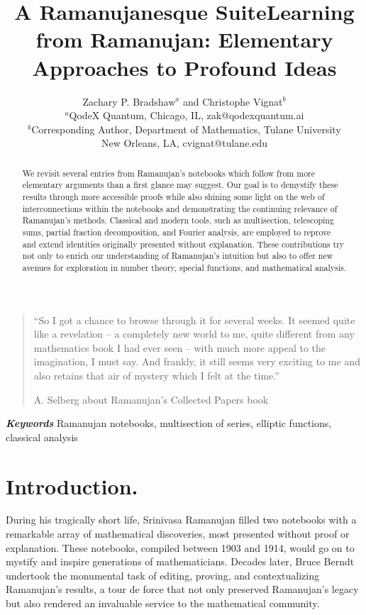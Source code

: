 \documentclass[11pt,oneside,reqno]{article}
\title{A Ramanujanesque Suite}
\title{Learning from Ramanujan: Elementary Approaches to Profound Ideas}
\author{ 
Zachary P. Bradshaw$^a$ and Christophe Vignat$^b$\\
$^a$QodeX Quantum, Chicago, IL, zak@qodexquantum.ai\\
$^b$Corresponding Author, Department of Mathematics, Tulane University\\ New Orleans, LA, cvignat@tulane.edu
}
\date{ }
\theoremstyle{definition}
\newcommand{\keywords}[1]{\textbf{\textit{Keywords }} #1}
\begin{document}
\maketitle


\begin{abstract}
    We revisit several entries from Ramanujan’s notebooks which follow from more elementary arguments than a first glance may suggest. Our goal is to demystify these results through more accessible proofs while also shining some light on the web of interconnections within the notebooks and demonstrating the continuing relevance of Ramanujan’s methods. Classical and modern tools, such as multisection, telescoping sums, partial fraction decomposition, and Fourier analysis, are employed to reprove and extend identities originally presented without explanation. These contributions try not only to enrich our understanding of Ramanujan’s intuition but also to offer new avenues for exploration in number theory, special functions, and mathematical analysis.
\end{abstract}


\begin{quote}
    ``So I got a chance to browse through it for several weeks. It seemed quite like a revelation -- a completely new world to me, quite different from any mathematics book I had ever seen -- with much more appeal to the imagination, I must say. And frankly, it still seems very exciting to me and also retains that air of mystery which I felt at the time.'' 
    
    A. Selberg \cite{Selberg} about Ramanujan's Collected Papers book \cite{Ramanujan Collected}
\end{quote}
\keywords{Ramanujan notebooks, multisection of series, elliptic functions, classical analysis}
\section{Introduction.}

During his tragically short life, Srinivasa Ramanujan filled two notebooks with a remarkable array of mathematical discoveries, most presented without proof or explanation. These notebooks, compiled between 1903 and 1914, would go on to mystify and inspire generations of mathematicians. Decades later, Bruce Berndt undertook the monumental task of editing, proving, and contextualizing Ramanujan’s results, a tour de force that not only preserved Ramanujan’s legacy but also rendered an invaluable service to the mathematical community.
\end{document}
